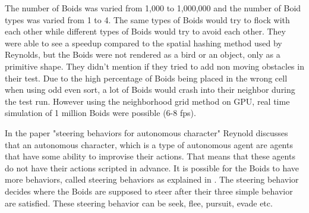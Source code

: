 The number of Boids was varied from 1,000 to 1,000,000 and the number of Boid types was varied from 1 to 4. The same types of Boids would try to flock with each other while different types of Boids would try to avoid each other.
They were able to see a speedup compared to the spatial hashing method used by Reynolds, but the Boids were not rendered as a bird or an object, only as a primitive shape. They didn't mention if they tried to add non moving obstacles in their test. Due to the high percentage of Boids being placed in the wrong cell when using odd even sort, a lot of Boids would crash into their neighbor during the test run. However using the neighborhood grid method on GPU, real time simulation of 1 million Boids were possible (6-8 fps).

In the paper "steering behaviors for autonomous character" Reynold discusses that an autonomous character, which is a type of autonomous agent are agents that have some ability to improvise their actions. That means that these agents do not have their actions scripted in advance.
It is possible for the Boids to have more behaviors, called steering behaviors as explained in \citep{Reynolds1999}. The steering behavior decides where the Boids are supposed to steer after their three simple behavior are satisfied.  These steering behavior can be seek, flee, pursuit, evade etc. 

